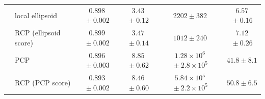 \begin{table}[!t]
{\begin{tabular}{llcccc}
 & local ellipsoid & $0.898${\scriptsize${}\pm0.002$} & $3.43${\scriptsize${}\pm0.12$} & $2202${\scriptsize${}\pm382$} & $6.57${\scriptsize${}\pm0.16$}\\
 & RCP (ellipsoid score) & $0.899${\scriptsize${}\pm0.002$} & $3.47${\scriptsize${}\pm0.14$} & $1012${\scriptsize${}\pm240$} & $7.12${\scriptsize${}\pm0.26$}\\
 & PCP & $0.896${\scriptsize${}\pm0.003$} & $8.85${\scriptsize${}\pm0.62$} & $1.28\times10^{6}${\scriptsize${}\pm2.8\times10^{5}$} & $41.8${\scriptsize${}\pm8.1$}\\
 & RCP (PCP score) & $0.893${\scriptsize${}\pm0.002$} & $8.46${\scriptsize${}\pm0.60$} & $5.84\times10^{5}${\scriptsize${}\pm2.2\times10^{5}$} & $50.8${\scriptsize${}\pm6.5$}\\
\bottomrule
\end{tabular}}
\end{table}
